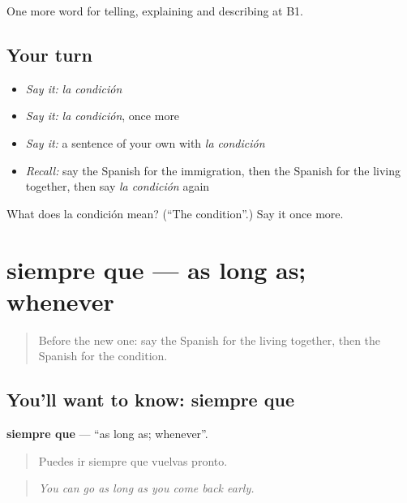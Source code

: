 \begin{grammarlens}[title={What you've built}]
One more word for telling, explaining and describing at B1.
\end{grammarlens}

\subsection*{Your turn}
\begin{itemize}
\raggedright
  \item \emph{Say it:} \emph{la condición}
  \item \emph{Say it:} \emph{la condición}, once more
  \item \emph{Say it:} a sentence of your own with \emph{la condición}
  \item \emph{Recall:} say the Spanish for the immigration, then the Spanish for the living together, then say \emph{la condición} again
\end{itemize}

\begin{tcolorbox}[breakable,colback=teal!4,colframe=teal!35!black,title={Before you move on}]
What does la condición mean? (\textquotedblleft{}The condition\textquotedblright{}.) Say it once more.
\end{tcolorbox}
\section[siempre que]{siempre que — as long as; whenever}

\label{lesson:ES-C611-siempre-que}



\begin{quote}
Before the new one: say the Spanish for the living together, then the Spanish for the condition.
\end{quote}

\subsection*{You'll want to know: siempre que}
\textbf{siempre que} — \textquotedblleft{}as long as; whenever\textquotedblright{}.

\begin{quote}
Puedes ir siempre que vuelvas pronto.
\end{quote}

\begin{quote}
\emph{You can go as long as you come back early.}
\end{quote}

